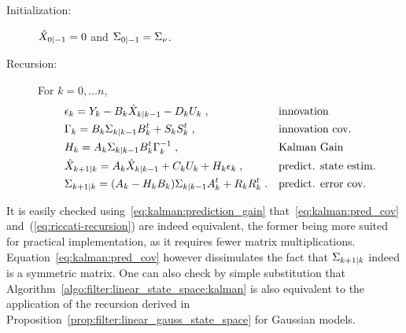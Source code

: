 \begin{algo}
  \label{algo:filter:linear_state_space:kalman}
  \begin{description}
  \item[Initialization:] $\hat{X}_{0|-1} = 0$ and $\Sigma_{0|-1} = \Sigma_{\nu}$.
  \item[Recursion:] For $k=0, \dots n$,
  \begin{align}
    &\I_k  = \Y_k - \B_k \postmean{k}{k-1} - \D_k \U_k \eqsp , && \text{innovation} \label{eq:kalman:innovation:in_pred_recursion} \\
    &\ICov_k  = \B_k\postcov{k}{k-1}\B_k^t + \VCov[k] \eqsp , && \text{innovation cov.} \label{eq:kalman:innovation_cov:in_pred_recursion} \\
    &\KGP{k}  =  \A_{k}\postcov{k}{k-1} \B_k^t \ICov_k^{-1} \eqsp , && \text{Kalman Gain} \label{eq:kalman:prediction_gain} \\
    &\postmean{k+1}{k}  = \A_{k}\postmean{k}{k-1} + \C_k \U_k + \KGP{k} \I_k \eqsp , && \text{predict. state estim.} \label{eq:kalman:pred_mean} \\
    &\postcov{k+1}{k}  = (\A_{k} - \KGP{k} \B_k) \postcov{k}{k-1}\A_{k}^t + \WCov[k] \eqsp . && \text{predict. error cov.} \label{eq:kalman:pred_cov}
  \end{align}
  \end{description}
\end{algo}

It is easily checked using~\eqref{eq:kalman:prediction_gain}
that~\eqref{eq:kalman:pred_cov} and~(\ref{eq:riccati-recursion}) are indeed
equivalent, the former being more suited for practical implementation, as it
requires fewer matrix multiplications. Equation~\eqref{eq:kalman:pred_cov} however
dissimulates the fact that $\Sigma_{k+1|k}$ indeed is a symmetric matrix. One
can also check by simple substitution that
Algorithm~\ref{algo:filter:linear_state_space:kalman} is also equivalent to
the application of the recursion derived in
Proposition~\ref{prop:filter:linear_gauss_state_space} for Gaussian models.

